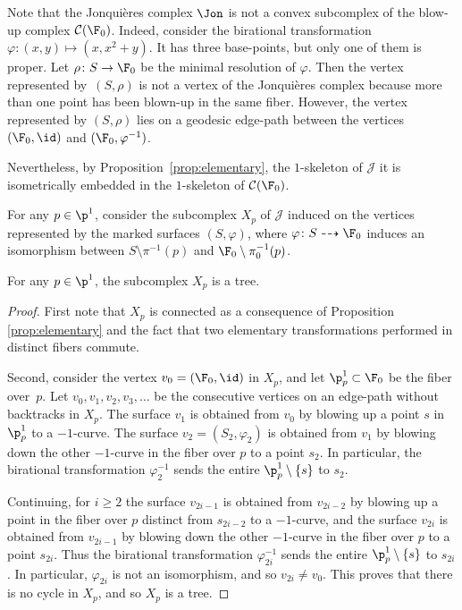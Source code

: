 \begin{remark}\label{remark:not_convex}
Note that the Jonquières complex $\Jon$ is not a convex subcomplex of the blow-up complex $\mathcal C(\F_0)$. Indeed, consider the birational transformation \hbox{$\varphi:(x,y)\mapsto (x,x^2+y)$}. It has three base-points, but only one of them is proper. Let $\rho \colon S\to \F_0$ be the minimal resolution of $\varphi$. Then the vertex represented by~$(S,\rho)$ is not a vertex of the Jonquières complex because more than one point has been blown-up in the same fiber. However, the vertex represented by $(S,
\rho)$ lies on a geodesic edge-path between the vertices $(\F_0,\id)$ and $(\F_0, \varphi^{-1})$.

Nevertheless, by Proposition~\ref{prop:elementary}, the $1$-skeleton of $\mathscr{J}$ it is isometrically embedded in the $1$-skeleton of $\mathcal C(\F_0)$.
\end{remark}

For any $p\in \p^1$, consider the subcomplex $X_p$ of $\mathscr{J}$ induced on the vertices represented by the marked surfaces $(S,\varphi)$, where $\varphi\colon S\dashrightarrow \F_0$ induces an isomorphism between $S\setminus \pi^{-1}(p)$ and $\F_0\setminus \pi_0^{-1}(p)$.

\begin{lemma}
\label{lem:tree}
For any $p\in \p^1$, the subcomplex $X_p$ is a tree.
\end{lemma}

\begin{proof}
First note that $X_p$ is connected as a consequence of Proposition \ref{prop:elementary} and the fact that two elementary transformations performed in distinct fibers commute.

Second, consider the vertex $v_0=(\F_0,\id)$ in $X_p$, and let $\p^1_p\subset \F_0$ be the fiber over~$p$. Let $v_0,v_1,v_2,v_3,\ldots$ be the consecutive vertices on an edge-path without backtracks in $X_p$. The surface $v_1$ is obtained from $v_0$ by blowing up a point {$s$} in $\p^1_p$ to a $-1$-curve. The surface $v_2=(S_2,\varphi_2)$ is obtained from $v_1$ by blowing down the other $-1$-curve in the fiber over $p$ to a point $s_2$. In particular, the birational transformation $\varphi^{-1}_2$ sends the entire {$\p^1_p\setminus \{s\}$} to $s_2$.

Continuing, for $i\geq 2$ the surface $v_{2i-1}$ is obtained from $v_{2i-2}$ by blowing up a point in the fiber over $p$ distinct from $s_{2i-2}$ to a $-1$-curve, and the surface $v_{2i}$ is obtained from $v_{2i-1}$ by blowing down the other $-1$-curve in the fiber over $p$ to a point $s_{2i}$. Thus the birational transformation $\varphi^{-1}_{2i}$ sends the entire {$\p^1_p\setminus \{s\}$} to $s_{2i}$. In particular, $\varphi_{2i}$ {is not an isomorphism}, and so $v_{2i}\neq v_0$. This proves that there is no cycle in $X_p$, and so $X_p$ is a tree.
\end{proof}

